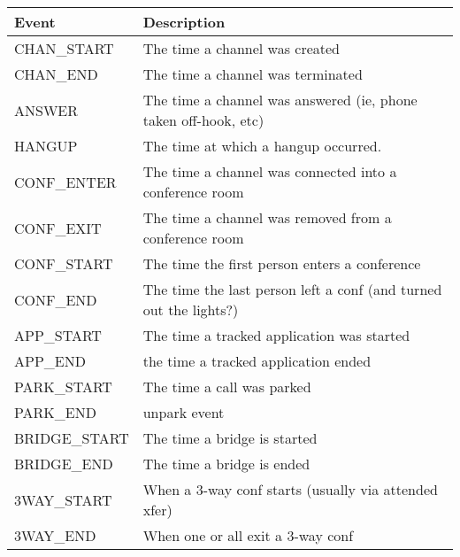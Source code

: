 \begin{table}[h]
  \begin{tabular}{ | l | p{10cm} | }
    \hline
    Event            & Description                                                               \\ \hline \hline
    CHAN\_START      & The time a channel was created                                            \\ \hline
    CHAN\_END        & The time a channel was terminated                                         \\ \hline
    ANSWER           & The time a channel was answered (ie, phone taken off-hook, etc)           \\ \hline
    HANGUP           & The time at which a hangup occurred.                                      \\ \hline
    CONF\_ENTER      & The time a channel was connected into a conference room                   \\ \hline
    CONF\_EXIT       & The time a channel was removed from a conference room                     \\ \hline
    CONF\_START      & The time the first person enters a conference                             \\ \hline
    CONF\_END        & The time the last person left a conf (and turned out the lights?)         \\ \hline
    APP\_START       & The time a tracked application was started                                \\ \hline
    APP\_END         & the time a tracked application ended                                      \\ \hline
    PARK\_START      & The time a call was parked                                                \\ \hline
    PARK\_END        & unpark event                                                              \\ \hline
    BRIDGE\_START    & The time a bridge is started                                              \\ \hline
    BRIDGE\_END      & The time a bridge is ended                                                \\ \hline
    3WAY\_START      & When a 3-way conf starts (usually via attended xfer)                      \\ \hline
    3WAY\_END        & When one or all exit a 3-way conf                                         \\ \hline

\end{tabular}
\end{table}

